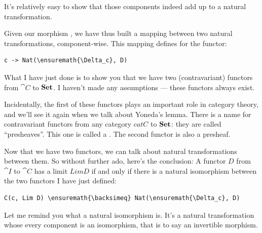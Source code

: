 It's relatively easy to show that those components indeed add up to a
natural transformation.

\begin{figure}[H]
\centering
{}
\end{figure}

\noindent
Given our morphism , we have thus built a mapping between two
natural transformations, component-wise. This mapping defines
 for the functor:

\begin{Verbatim}[commandchars=\\\{\}]
c -> Nat(\ensuremath{\Delta_c}, D)
\end{Verbatim}

What I have just done is to show you that we have two (contravariant)
functors from $\cat{C}$ to $\mathbf{Set}$. I haven't made any assumptions
--- these functors always exist.

Incidentally, the first of these functors plays an important role in
category theory, and we'll see it again when we talk about Yoneda's
lemma. There is a name for contravariant functors from any category
$cat{C}$ to $\mathbf{Set}$: they are called ``presheaves''. This one is
called a . The second functor is also a
presheaf.

Now that we have two functors, we can talk about natural transformations
between them. So without further ado, here's the conclusion: A functor
$D$ from $\cat{I}$ to $\cat{C}$ has a limit $Lim D$ if and
only if there is a natural isomorphism between the two functors I have
just defined:

\begin{Verbatim}[commandchars=\\\{\}]
C(c, Lim D) \ensuremath{\backsimeq} Nat(\ensuremath{\Delta_c}, D)
\end{Verbatim}

Let me remind you what a natural isomorphism is. It's a natural
transformation whose every component is an isomorphism, that is to say
an invertible morphism.

